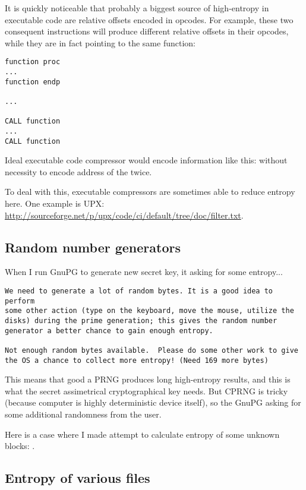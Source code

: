 It is quickly noticeable that probably a biggest source of high-entropy in executable code are relative offsets encoded in opcodes.
For example, these two consequent instructions will produce different relative offsets in their opcodes, 
while they are in fact pointing to the same function:

\begin{lstlisting}
function proc
...
function endp

...

CALL function
...
CALL function
\end{lstlisting}

Ideal executable code compressor would encode information like this:
 without necessity to encode
address of the  twice.

To deal with this, executable compressors are sometimes able to reduce entropy here.
One example is UPX: \url{http://sourceforge.net/p/upx/code/ci/default/tree/doc/filter.txt}.

\subsection{Random number generators}

When I run GnuPG to generate new secret key, it asking for some entropy...

\begin{lstlisting}
We need to generate a lot of random bytes. It is a good idea to perform
some other action (type on the keyboard, move the mouse, utilize the
disks) during the prime generation; this gives the random number
generator a better chance to gain enough entropy.

Not enough random bytes available.  Please do some other work to give
the OS a chance to collect more entropy! (Need 169 more bytes)
\end{lstlisting}

This means that good a PRNG produces long high-entropy results, and this is what the secret assimetrical cryptographical key needs.
But \ac{CPRNG} is tricky (because computer is highly deterministic device itself),
so the GnuPG asking for some additional randomness from the user.

Here is a case where I made attempt to calculate entropy of some unknown blocks: .

\subsection{Entropy of various files}

